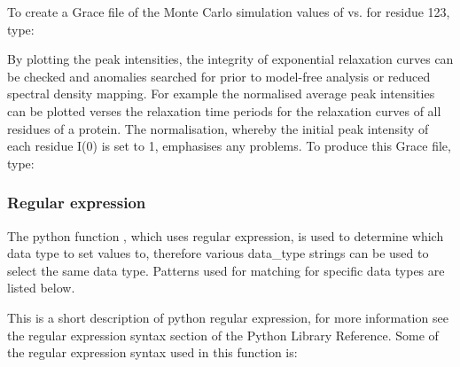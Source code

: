 


 To create a Grace file of the Monte Carlo simulation values of  vs.  for residue 123, type: 
  



 By plotting the peak intensities, the integrity of exponential relaxation curves can be checked and anomalies searched for prior to model-free analysis or reduced spectral density mapping.  For example the normalised average peak intensities can be plotted verses the relaxation time periods for the relaxation curves of all residues of a protein.  The normalisation, whereby the initial peak intensity of each residue I(0) is set to 1, emphasises any problems.  To produce this Grace file, type: 
  


  
 \subsubsection{Regular expression} 

 The python function , which uses regular expression, is used to determine which data type to set values to, therefore various data\_type strings can be used to select the same data type.  Patterns used for matching for specific data types are listed below. 
  

 This is a short description of python regular expression, for more information see the regular expression syntax section of the Python Library Reference.  Some of the regular expression syntax used in this function is: 
  

